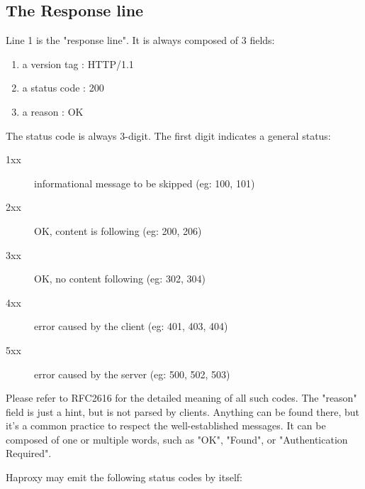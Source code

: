 \subsection{The Response line}
Line 1 is the "response line". It is always composed of 3 fields:

\begin{enumerate}
\item a version tag : HTTP/1.1
\item a status code : 200
\item a reason      : OK
\end{enumerate}

The status code is always 3-digit. The first digit indicates a general status:

\begin{description}
\item[1xx] informational message to be skipped (eg: 100, 101)
\item[2xx] OK, content is following   (eg: 200, 206)
\item[3xx] OK, no content following   (eg: 302, 304)
\item[4xx] error caused by the client (eg: 401, 403, 404)
\item[5xx] error caused by the server (eg: 500, 502, 503)
\end{description}

Please refer to RFC2616 for the detailed meaning of all such codes. The
"reason" field is just a hint, but is not parsed by clients. Anything can be
found there, but it's a common practice to respect the well-established
messages. It can be composed of one or multiple words, such as "OK", "Found",
or "Authentication Required".

Haproxy may emit the following status codes by itself:


